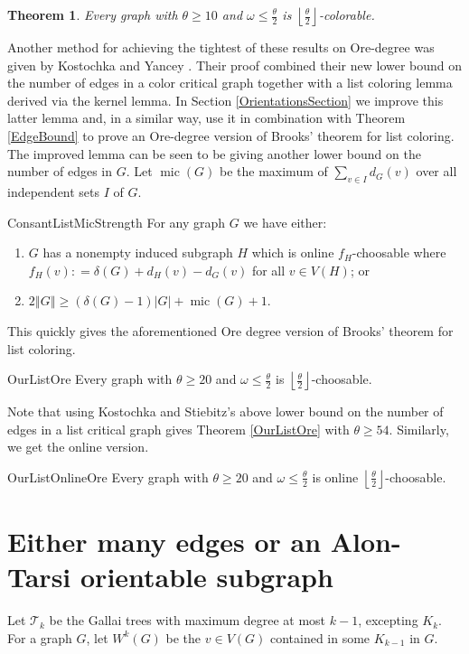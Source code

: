 \documentclass[12pt]{article}
\theoremstyle{plain}
\newtheorem{thm}{Theorem}[section]
\theoremstyle{definition}
\theoremstyle{remark}
\newcommand{\fancy}[1]{\mathcal{#1}}
\newcommand{\T}{\fancy{T}}
\newcommand{\card}[1]{\left|#1\right|}
\newcommand{\size}[1]{\left\Vert#1\right\Vert}
\newcommand{\floor}[1]{\left\lfloor#1\right\rfloor}
\newcommand{\DefinedAs}{\mathrel{\mathop:}=}
\newcommand{\mic}{\operatorname{mic}}
\begin{document}
\begin{thm}\label{RegularOre}
Every graph with $\theta \geq 10$ and $\omega \leq \frac{\theta}{2}$ is $\floor{\frac{\theta}{2}}$-colorable.
\end{thm}

Another method for achieving the tightest of these results on Ore-degree was given by Kostochka and Yancey \cite{kostochkayancey2012ore}.  Their proof combined their new lower bound on the number of edges in a color critical graph together with a list coloring lemma derived via the kernel lemma.  In Section \ref{OrientationsSection} we improve this latter lemma and, in a similar way, use it in combination with Theorem \ref{EdgeBound} to prove an Ore-degree version of Brooks' theorem for list coloring.  The improved lemma can be seen to be giving another lower bound on the number of edges in $G$. Let $\mic(G)$ be the maximum of $\sum_{v \in I} d_G(v)$ over all independent sets $I$ of $G$.

\begin{repthm}{ConsantListMicStrength}
For any graph $G$ we have either:
\begin{enumerate}
\item $G$ has a nonempty induced subgraph $H$ which is online $f_H$-choosable where $f_H(v) \DefinedAs \delta(G) + d_H(v) - d_G(v)$ for all $v \in V(H)$; or
\item $2\size{G} \geq (\delta(G) - 1)\card{G} + \mic(G) + 1$.
\end{enumerate}
\end{repthm}

\noindent This quickly gives the aforementioned Ore degree version of Brooks' theorem for list coloring.

\begin{repthm}{OurListOre}
Every graph with $\theta \geq 20$ and $\omega \leq \frac{\theta}{2}$ is $\floor{\frac{\theta}{2}}$-choosable.
\end{repthm}

\noindent Note that using Kostochka and Stiebitz's above lower bound on the number of edges in a list critical graph gives Theorem \ref{OurListOre} with $\theta \geq 54$. Similarly, we get the online version.

\begin{repthm}{OurListOnlineOre}
Every graph with $\theta \geq 20$ and $\omega \leq \frac{\theta}{2}$ is online $\floor{\frac{\theta}{2}}$-choosable.
\end{repthm}

\section{Either many edges or an Alon-Tarsi orientable subgraph}
Let $\T_k$ be the Gallai trees with maximum degree at most $k-1$, excepting $K_k$. For a graph $G$, let $W^k(G)$ be the $v \in V(G)$ contained in some $K_{k-1}$ in $G$. 
\end{document}

